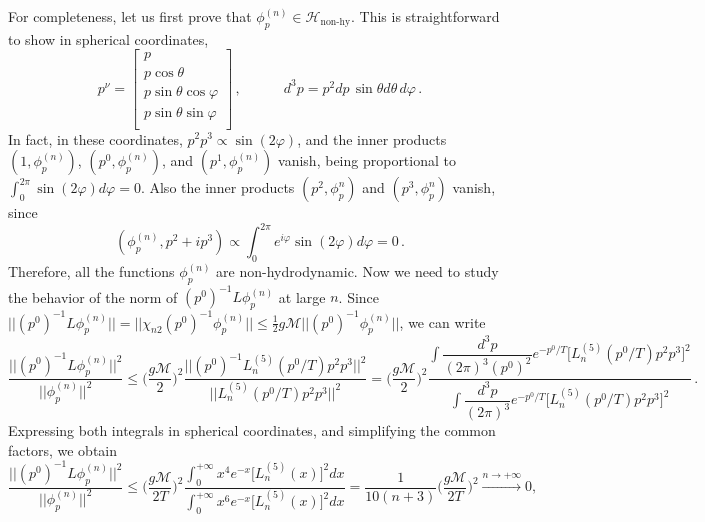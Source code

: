 \documentclass[a4paper, amsfonts, amssymb, amsmath, reprint, showkeys, nofootinbib, twoside, onecolumn,notitlepage,,longbibliography]{revtex4-2}
\newcommand{\spc}{\quad \quad \quad}
\theoremstyle{definition}
\theoremstyle{theorem}
\theoremstyle{corollary}
\begin{document}
For completeness, let us first prove that $\phi_p^{(n)}\in \mathcal{H}_{\text{non-hy}}$. This is straightforward to show in spherical coordinates, 
\begin{equation}
    p^\nu =
    \begin{bmatrix}
p \\
p \cos \theta \\
p \sin \theta \cos \varphi \\
p \sin \theta \sin \varphi \\
    \end{bmatrix} \, , \spc d^3p=p^2 dp \, \sin \theta d\theta \, d\varphi \, .
\end{equation}
In fact, in these coordinates, $p^{2} p^{3}  \propto \sin(2\varphi)$, and the inner products $(1,\phi_p^{(n)})$, $(p^0,\phi_p^{(n)})$, and $(p^1,\phi_p^{(n)})$ vanish, being proportional to $\int_0^{2\pi}\sin(2\varphi)d\varphi=0$. Also the inner products $(p^2,\phi_p^{n})$ and $(p^3,\phi_p^{n})$ vanish, since
\begin{equation}
    (\phi_p^{(n)}, p^2{+}ip^3) \propto \int_0^{2\pi} e^{i\varphi}\sin(2\varphi) d\varphi =0 \, .
\end{equation}
Therefore, all the functions $\phi_p^{(n)}$ are non-hydrodynamic. Now we need to study the behavior of the norm of $(p^0)^{-1}L\phi_p^{(n)}$ at large $n$. Since $||(p^0)^{-1}L\phi_p^{(n)}||=||\chi_{n2}(p^0)^{-1}\phi_p^{(n)}|| \leq \frac{1}{2}g\mathcal{M}|| (p^0)^{-1}\phi_p^{(n)}||$, we can write
\begin{equation}
\dfrac{|| (p^0)^{-1} L \phi_p^{(n)} ||^2}{||\phi_p^{(n)}||^2}\leq \bigg(\dfrac{g\mathcal{M}}{2}\bigg)^2 \dfrac{|| (p^0)^{-1} L_n^{(5)}(p^0/T) p^{ 2} p^{3 } ||^2}{|| L_n^{(5)}(p^0/T) p^{ 2} p^{3 }||^2} = \bigg(\dfrac{g\mathcal{M}}{2}\bigg)^2 \dfrac{ \displaystyle\int \dfrac{d^3 p}{(2\pi)^3(p^0)^2} e^{-p^0/T} \bigg[ L_n^{(5)}(p^0/T) p^{ 2} p^{3 }\bigg]^2}{\displaystyle\int \dfrac{d^3 p}{(2\pi)^3} e^{-p^0/T} \bigg[L_n^{(5)}(p^0/T) p^{ 2} p^{3 }\bigg]^2} \, .
\end{equation}
Expressing both integrals in spherical coordinates, and simplifying the common factors, we obtain
\begin{equation}
    \dfrac{|| (p^0)^{-1} L \phi_p^{(n)} ||^2}{||\phi_p^{(n)}||^2} \leq \bigg(\dfrac{g\mathcal{M}}{2T}\bigg)^2 \dfrac{ \displaystyle\int_0^{+\infty}   x^4  e^{-x} \big[ L_n^{(5)}(x) \big]^2 dx} {\displaystyle\int_0^{+\infty}   x^6  e^{-x} \big[ L_n^{(5)}(x) \big]^2 dx} =\dfrac{1}{10 (n{+}3)} \bigg(\dfrac{g\mathcal{M}}{2T}\bigg)^2 \xrightarrow[]{n\rightarrow +\infty} 0,
\end{equation}
\end{document}
